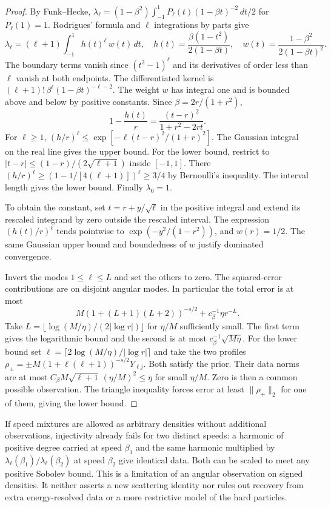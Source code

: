 \begin{proof}
By Funk--Hecke, $\lambda_\ell=(1-\beta^2)\int_{-1}^1
 P_\ell(t)(1-\beta t)^{-2}\,dt/2$ for $P_\ell(1)=1$.
Rodrigues' formula and $\ell$ integrations by parts give
\[
 \lambda_\ell=(\ell+1)\int_{-1}^1 h(t)^\ell\,w(t)\,dt,\quad
 h(t)=\frac{\beta(1-t^2)}{2(1-\beta t)},\quad
 w(t)=\frac{1-\beta^2}{2(1-\beta t)^2}.
\]
The boundary terms vanish since $(t^2-1)^\ell$ and its derivatives of
order less than $\ell$ vanish at both endpoints. The differentiated
kernel is $(\ell+1)!\,\beta^\ell(1-\beta t)^{-\ell-2}$.
The weight $w$ has integral one and is bounded above and below by
positive constants. Since $\beta=2r/(1+r^2)$,
\[
 1-\frac{h(t)}r=\frac{(t-r)^2}{1+r^2-2rt}.
\]
For $\ell\ge1$, $(h/r)^\ell\le
\exp[-\ell(t-r)^2/(1+r)^2]$. The Gaussian integral on the real line gives
the upper bound. For the lower bound, restrict to
$|t-r|\le(1-r)/(2\sqrt{\ell+1})$ inside $[-1,1]$. There
$(h/r)^\ell\ge (1-1/[4(\ell+1)])^\ell\ge 3/4$ by Bernoulli's
inequality. The interval length gives the lower bound. Finally
$\lambda_0=1$.

To obtain the constant, set $t=r+y/\sqrt{\ell}$ in the positive
integral and extend its rescaled integrand by zero outside the
rescaled interval. The expression $(h(t)/r)^\ell$ tends pointwise to
$\exp(-y^2/(1-r^2))$, and $w(r)=1/2$. The same Gaussian upper
bound and boundedness of $w$ justify dominated convergence.

Invert the modes $1\le\ell\le L$ and set the others to zero.
The squared-error contributions are on disjoint angular modes. In
particular the total error is at most
\[
 M(1+(L+1)(L+2))^{-s/2}+c_\beta^{-1}\eta r^{-L}.
\]
Take $L=\lfloor \log(M/\eta)/(2|\log r|)\rfloor$ for $\eta/M$
sufficiently small. The first term gives the logarithmic bound and
the second is at most $c_\beta^{-1}\sqrt{M\eta}$.
For the lower bound set
$\ell=\lceil 2\log(M/\eta)/|\log r|\rceil$ and take the two profiles
$\rho_\pm=\pm M(1+\ell(\ell+1))^{-s/2}Y_{\ell j}$. Both satisfy the
prior. Their data norms are at most
$C_\beta M\sqrt{\ell+1}\,(\eta/M)^2\le\eta$ for small $\eta/M$.
Zero is then a common possible observation. The triangle inequality
forces error at least $\|\rho_+\|_2$ for one of them, giving the lower bound.
\end{proof}

If speed mixtures are allowed as arbitrary densities without
additional observations, injectivity already fails for two distinct
speeds: a harmonic of positive degree carried at speed $\beta_1$ and
the same harmonic multiplied by $\lambda_\ell(\beta_1)/\lambda_\ell(\beta_2)$
at speed $\beta_2$ give identical data. Both can be scaled to meet any
positive Sobolev bound. This is a limitation of an angular observation
on signed densities. It neither asserts a new scattering identity nor
rules out recovery from extra energy-resolved data or a more restrictive
model of the hard particles.
